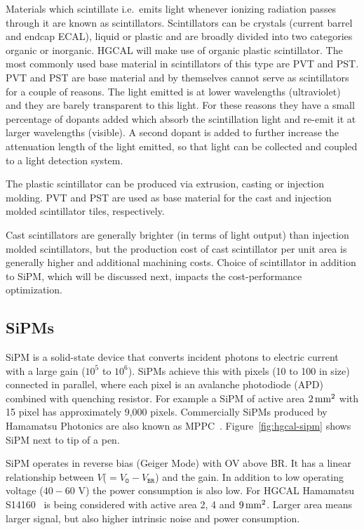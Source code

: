 Materials which scintillate i.e.~emits light
whenever ionizing radiation passes through it are known as
scintillators. Scintillators can be crystals (current barrel and endcap
\gls{ECAL}), liquid or plastic and are broadly divided into two
categories organic or inorganic.
\gls{HGCAL} will make use of organic plastic scintillator. The most
commonly used base material in scintillators of this type are \gls{PVT} and \gls{PST}.
\gls{PVT} and \gls{PST} are base material and
by themselves cannot serve as scintillators for a couple of
reasons. The light emitted is at lower wavelengths (ultraviolet)
and they are barely transparent to this light.
For these reasons they have a small percentage of dopants added
which absorb the scintillation light and re-emit it at larger wavelengths (visible).
A second dopant is added to further increase the attenuation length of
the light emitted, so that light can be collected and coupled to a light
detection system.

The plastic scintillator can be produced via extrusion, casting or injection molding.
\gls{PVT} and \gls{PST} are used as base material for the cast and
injection molded scintillator tiles, respectively.

Cast scintillators are generally brighter (in terms of light output)
than injection molded scintillators, but the production cost of
cast scintillator per unit area is generally higher and additional
machining costs.
Choice of scintillator in addition to \gls{SiPM}, which will be discussed next,
impacts the cost-performance optimization.

\subsection{
  SiPMs
}

\gls{SiPM} is a solid-state device that converts incident photons to electric
current with a large gain (\( 10^5 \) to \( 10^6 \)).
\glspl{SiPM} achieve this with pixels (10\micron{} to 100\micron{} in size)
connected in parallel, where each pixel is an avalanche photodiode (APD)
combined with quenching resistor. For example a \gls{SiPM} of active
area \( 2\,\text{mm}{}^2 \) with 15\micron{} pixel has approximately 9,000 pixels.
Commercially \glspl{SiPM} produced by Hamamatsu Photonics are also known as \gls{MPPC}~\cite{mppc-13360}. Figure~\ref{fig:hgcal-sipm}
shows \gls{SiPM} next to tip of a pen.

\gls{SiPM} operates in reverse bias (Geiger Mode) with \gls{OV} above \gls{BR}.
It has a linear relationship between \(V\)(\(= V_{\texttt{O}} - V_{\texttt{BR}} \)) and the gain.
In addition to low operating voltage (\(40-60\) V) the power
consumption is also low.
For \gls{HGCAL} Hamamatsu S14160~\cite{mppc-14160} is being considered with
active area 2, 4 and \(9\,\text{mm}{}^2\). Larger area means larger signal, but
also higher intrinsic noise and power consumption.

